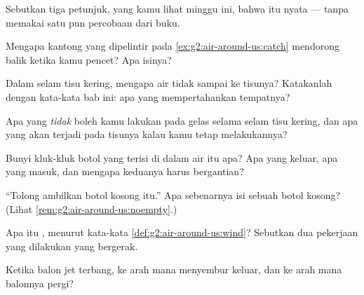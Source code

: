 \begin{exercise}[$\star$]\label{exo:g2:air-around-us:1}
Sebutkan tiga petunjuk, yang kamu lihat minggu ini, bahwa  itu
nyata --- tanpa memakai satu pun percobaan dari buku.
\end{exercise}

\begin{exercise}[$\star$]\label{exo:g2:air-around-us:2}
Mengapa kantong yang dipelintir pada \cref{ex:g2:air-around-us:catch}
mendorong balik ketika kamu pencet? Apa isinya?
\end{exercise}

\begin{exercise}[$\star$]\label{exo:g2:air-around-us:3}
Dalam selam tisu kering, mengapa air tidak sampai ke tisunya?
Katakanlah dengan kata-kata bab ini: apa yang mempertahankan tempatnya?
\end{exercise}

\begin{exercise}[$\star$]\label{exo:g2:air-around-us:4}
Apa yang \emph{tidak} boleh kamu lakukan pada gelas selama selam tisu
kering, dan apa yang akan terjadi pada tisunya kalau kamu tetap
melakukannya?
\end{exercise}

\begin{exercise}[$\star$]\label{exo:g2:air-around-us:5}
Bunyi kluk-kluk botol yang terisi di dalam air itu apa? Apa yang
keluar, apa yang masuk, dan mengapa keduanya harus bergantian?
\end{exercise}

\begin{exercise}[$\star$]\label{exo:g2:air-around-us:6}
``Tolong ambilkan botol kosong itu.'' Apa sebenarnya isi sebuah botol
kosong? (Lihat \cref{rem:g2:air-around-us:noempty}.)
\end{exercise}

\begin{exercise}[$\star$]\label{exo:g2:air-around-us:7}
Apa itu , menurut kata-kata \cref{def:g2:air-around-us:wind}?
Sebutkan dua pekerjaan yang dilakukan  yang bergerak.
\end{exercise}

\begin{exercise}[$\star$]\label{exo:g2:air-around-us:8}
Ketika balon jet terbang, ke arah mana  menyembur keluar, dan
ke arah mana balonnya pergi?
\end{exercise}

